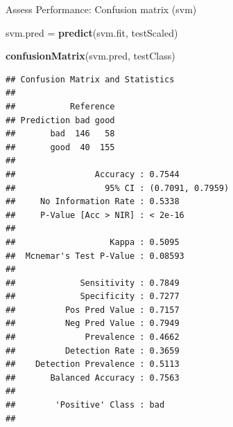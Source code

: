 \documentclass[ignorenonframetext,]{beamer}
\newenvironment{Shaded}{\begin{snugshade}}{\end{snugshade}}
\newcommand{\KeywordTok}[1]{\textcolor[rgb]{0.13,0.29,0.53}{\textbf{#1}}}
\newcommand{\StringTok}[1]{\textcolor[rgb]{0.31,0.60,0.02}{#1}}
\newcommand{\NormalTok}[1]{#1}
\begin{document}
\begin{frame}[fragile]{Assess Performance: Confusion matrix (svm)}

\begin{Shaded}
\begin{Highlighting}[]
\NormalTok{svm.pred =}\StringTok{ }\KeywordTok{predict}\NormalTok{(svm.fit, testScaled)}

\KeywordTok{confusionMatrix}\NormalTok{(svm.pred, testClass)}
\end{Highlighting}
\end{Shaded}

\begin{verbatim}
## Confusion Matrix and Statistics
## 
##           Reference
## Prediction bad good
##       bad  146   58
##       good  40  155
##                                           
##                Accuracy : 0.7544          
##                  95% CI : (0.7091, 0.7959)
##     No Information Rate : 0.5338          
##     P-Value [Acc > NIR] : < 2e-16         
##                                           
##                   Kappa : 0.5095          
##  Mcnemar's Test P-Value : 0.08593         
##                                           
##             Sensitivity : 0.7849          
##             Specificity : 0.7277          
##          Pos Pred Value : 0.7157          
##          Neg Pred Value : 0.7949          
##              Prevalence : 0.4662          
##          Detection Rate : 0.3659          
##    Detection Prevalence : 0.5113          
##       Balanced Accuracy : 0.7563          
##                                           
##        'Positive' Class : bad             
## 
\end{verbatim}

\end{frame}
\end{document}
